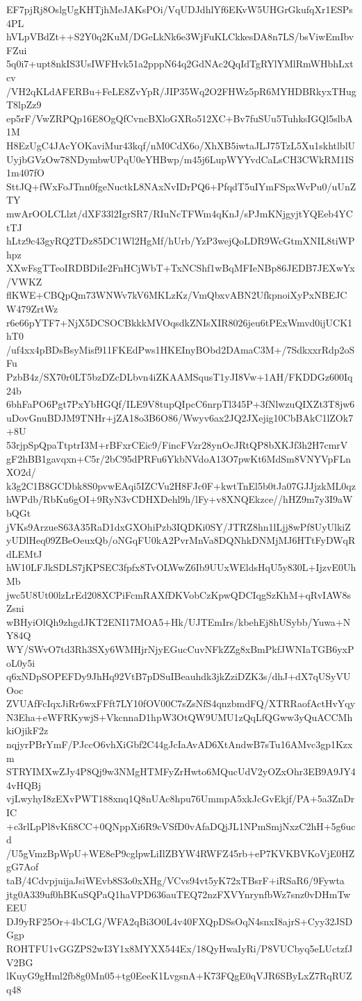 EF7pjRj8OslgUgKHTjhMeJAKsPOi/VqUDJdhlYf6EKvW5UHGrGkufqXr1ESPs4PL
hVLpVBdZt++S2Y0q2KuM/DGeLkNk6e3WjFuKLCkkesDA8n7LS/bsViwEmIbvFZui
5q0i7+upt8nkIS3UsIWFHvk51a2pppN64q2GdNAc2QqIdTgRYlYMlRmWHbhLxtcv
/VH2qKLdAFERBu+FeLE8ZvYpR/JIP35Wq2O2FHWz5pR6MYHDBRkyxTHugT8lpZz9
ep5rF/VwZRPQp16E8OgQfCvncBXloGXRo512XC+Bv7fuSUu5TuhksIGQl5slbA1M
H8EzUgC4JAcYOKaviMur43kqf/nM0CdX6o/XhXB5iwtaJLJ75TzL5Xu1skhtlblU
UyjbGVzOw78NDymbwUPqU0eYHBwp/m45j6LupWYYvdCaLsCH3CWkRM1IS1m407fO
SttJQ+fWxFoJTnn0fgeNuctkL8NAxNvIDrPQ6+PfqdT5uIYmFSpxWvPu0/uUnZTY
mwArOOLCLlzt/dXF33l2IgrSR7/RIuNcTFWm4qKnJ/sPJmKNjgyjtYQEeb4YCtTJ
hLtz9c43gyRQ2TDz85DC1Wl2HgMf/hUrb/YzP3wejQoLDR9WcGtmXNIL8tiWPhpz
XXwFsgTTeoIRDBDiIe2FnHCjWbT+TxNCShf1wBqMFIeNBp86JEDB7JEXwYx/VWKZ
flKWE+CBQpQm73WNWv7kV6MKLzKz/VmQbxvABN2UfkpnoiXyPxNBEJCW479ZrtWz
r6e66pYTF7+NjX5DCSOCBkkkMVOqsdkZNIsXIR8026jeu6tPExWmvd0ijUCK1hT0
/uf4xx4pBDsBsyMisf911FKEdPws1HKEInyBObd2DAmaC3M+/7SdkxxrRdp2oSFu
PzbB4z/SX70r0LT5bzDZcDLbvn4iZKAAMSqusT1yJI8Vw+1AH/FKDDGz600Iq24b
6bhFaPO6Pgt7PxYbHGQf/ILE9V8tupQIpcC6nrpTl345P+3fNlwzuQIXZt3T8jw6
uDovGnuBDJM9TNHr+jZA18o3B6O86/Wwyv6ax2JQ2JXejig10CbBAkC1lZOk7+8U
53rjpSpQpaTtptrI3M+rBFxrCEic9/FincFVzr28ynOcJRtQP8bXKJf3h2H7cmrV
gF2hBB1gavqxn+C5r/2bC95dPRFu6YkbNVdoA13O7pwKt6MdSm8VNYVpFLnXO2d/
k3g2C1B8GCDbk8S0pvwEAqi5IZCVu2H8FJc0F+kwtTnEl5b0tJa07GJJjzkML0qz
hWPdb/RbKu6gOI+9RyN3vCDHXDehl9h/lFy+v8XNQEkzce//hHZ9m7y3I9aWbQGt
jVKs9ArzueS63A35RaD1dxGXOhiPzb3IQDKi0SY/JTRZ8hn1lLjj8wPf8UyUlkiZ
yUDlHeq09ZBeOeuxQb/oNGqFU0kA2PvrMnVa8DQNhkDNMjMJ6HTtFyDWqRdLEMtJ
hW10LFJkSDLS7jKPSEC3fpfx8TvOLWwZ6Ib9UUxWEldsHqU5y830L+IjzvE0UhMb
jwc5U8Ut00lzLrEd208XCPiFcmRAXfDKVobCzKpwQDCIqgSzKhM+qRvIAW8sZsni
wBHyiOlQh9zhgdJKT2ENI17MOA5+Hk/UJTEmIrs/kbehEj8hUSybb/Yuwa+NY84Q
WY/SWvO7td3Rh3SXy6WMHjrNjyEGucCuvNFkZZg8xBmPkfJWNIaTGB6yxPoL0y5i
q6xNDpSOPEFDy9JhHq92VtB7pDSuIBeauhdk3jkZziDZK3s/dhJ+dX7qUSyVUOoc
ZVUAfFcIqxJiRr6wxFFft7LY10fOV00C7sZsNfS4qnzbmdFQ/XTRRaofActHvYqy
N3Eha+eWFRKywjS+VkcnnaD1hpW3OtQW9UMU1zQqLfQGww3yQuACCMhkiOjikF2z
nqjyrPBrYmF/PJccO6vhXiGbf2C44gJcIaAvAD6XtAndwB7sTu16AMvc3gp1Kzxm
STRYIMXwZJy4P8Qj9w3NMgHTMFyZrHwto6MQucUdV2yOZxOhr3EB9A9JY44vHQBj
vjLwyhyI8zEXvPWT188xnq1Q8nUAc8hpu76UmmpA5xkJcGvEkjf/PA+5a3ZnDrIC
+c3rlLpPl8vKfi8CC+0QNppXi6R9cVSfD0vAfaDQjJL1NPmSmjNxzC2hH+5g6ucd
/U5gVmzBpWpU+WE8eP9cglpwLiIlZBYW4RWFZ45rb+eP7KVKBVKoVjE0HZgG7Aof
taB/4CdvpjuijaJsiWEvb8S3o0xXHg/VCvs94vt5yK72xTBsrF+iRSaR6/9Fywta
jtg0A339uf0hBKuSQPaQ1haVPD636auTEQ72nzFXVYnrynfbWz7snz0vDHmTwEEU
DJ9yRF25Or+4bCLG/WFA2qBi3O0L4v40FXQpDSsOqN4snxI8ajrS+Cyy32JSDGgp
ROHTFU1vGGZPS2wI3Y1x8MYXX544Ex/18QyHwaIyRi/P8VUCbyq5eLUctzfJV2BG
lKuyG9gHml2fb8g0Mn05+tg0EeeK1LvgsnA+K73FQgE0qVJR6SByLxZ7RqRUZq48
